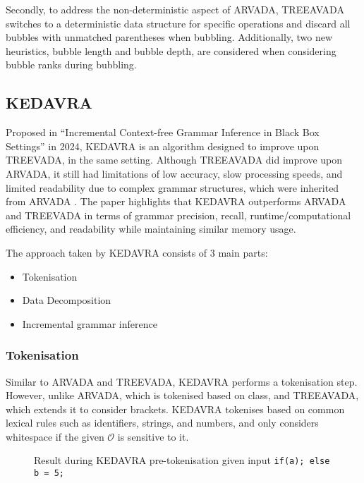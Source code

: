 Secondly, to address the non-deterministic aspect of ARVADA, TREEAVADA switches to a deterministic data structure for specific operations and discard all bubbles with unmatched parentheses when bubbling. Additionally, two new heuristics, bubble length and bubble depth, are considered when considering bubble ranks during bubbling.

\subsection{KEDAVRA}

Proposed in \enquote{Incremental Context-free Grammar Inference in Black Box
Settings} \cite{liIncrementalContextfreeGrammar2024} in 2024, KEDAVRA is an algorithm designed to improve upon TREEVADA, in the same setting. Although TREEAVADA did improve upon ARVADA, it still had limitations of low accuracy, slow processing speeds, and limited readability due to complex grammar structures, which were inherited from ARVADA \cite{liIncrementalContextfreeGrammar2024,kulkarniLearningHighlyRecursive2021}. 
The paper highlights that KEDAVRA outperforms ARVADA and TREEVADA in terms of grammar precision, recall, runtime/computational efficiency, and readability while maintaining similar memory usage.

\vspace{\baselineskip}
The approach taken by KEDAVRA consists of 3 main parts:
\begin{itemize}
    \item Tokenisation
    \item Data Decomposition
    \item Incremental grammar inference
\end{itemize}

\subsubsection{Tokenisation}
Similar to ARVADA and TREEVADA, KEDAVRA performs a tokenisation step. However, unlike ARVADA, which is tokenised based on class, and TREEAVADA, which extends it to consider brackets. KEDAVRA tokenises based on common lexical rules such as identifiers, strings, and numbers, and only considers whitespace if the given $\mathcal{O}$ is sensitive to it. 

\begin{figure}[h!]
\centering
{}
\caption{Result during KEDAVRA pre-tokenisation given input \texttt{if(a); else b = 5;}}
\label{fig:pre-tokenising KEDAVRA}
\end{figure}

